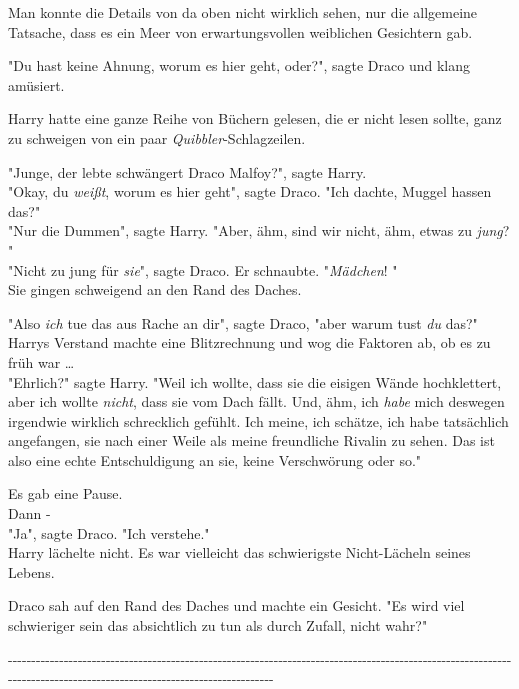 {Man konnte die Details von da oben nicht wirklich sehen, nur die allgemeine Tatsache, dass es ein Meer von erwartungsvollen weiblichen Gesichtern gab.

"Du hast keine Ahnung, worum es hier geht, oder?", sagte Draco und klang amüsiert.

Harry hatte eine ganze Reihe von Büchern gelesen, die er nicht lesen sollte, ganz zu schweigen von ein paar \emph{Quibbler}-Schlagzeilen.

"Junge, der lebte schwängert Draco Malfoy?", sagte Harry.\\ "Okay, du \emph{weißt}, worum es hier geht", sagte Draco. "Ich dachte, Muggel hassen das?"\\ "Nur die Dummen", sagte Harry. "Aber, ähm, sind wir nicht, ähm, etwas zu \emph{jung}? "\\ "Nicht zu jung für \emph{sie}", sagte Draco. Er schnaubte. "\emph{Mädchen}! "\\ Sie gingen schweigend an den Rand des Daches.

"Also \emph{ich} tue das aus Rache an dir", sagte Draco, "aber warum tust \emph{du} das?"\\ Harrys Verstand machte eine Blitzrechnung und wog die Faktoren ab, ob es zu früh war …\\ "Ehrlich?" sagte Harry. "Weil ich wollte, dass sie die eisigen Wände hochklettert, aber ich wollte \emph{nicht}, dass sie vom Dach fällt. Und, ähm, ich \emph{habe} mich deswegen irgendwie wirklich schrecklich gefühlt. Ich meine, ich schätze, ich habe tatsächlich angefangen, sie nach einer Weile als meine freundliche Rivalin zu sehen. Das ist also eine echte Entschuldigung an sie, keine Verschwörung oder so."

Es gab eine Pause.\\ Dann -\\ "Ja", sagte Draco. "Ich verstehe."\\ Harry lächelte nicht. Es war vielleicht das schwierigste Nicht-Lächeln seines Lebens.

Draco sah auf den Rand des Daches und machte ein Gesicht. "Es wird viel schwieriger sein das absichtlich zu tun als durch Zufall, nicht wahr?"

-\/-\/-\/-\/-\/-\/-\/-\/-\/-\/-\/-\/-\/-\/-\/-\/-\/-\/-\/-\/-\/-\/-\/-\/-\/-\/-\/-\/-\/-\/-\/-\/-\/-\/-\/-\/-\/-\/-\/-\/-\/-\/-\/-\/-\/-\/-\/-\/-\/-\/-\/-\/-\/-\/-\/-\/-\/-\/-\/-\/-\/-\/-\/-\/-\/-\/-\/-\/-\/-\/-\/-\/-\/-\/-\/-\/-\/-\/-\/-\/-\/-\/-\/-\/-\/-\/-\/-\/-\/-\/-\/-\/-\/-\/-\/-\/-\/-\/-\/-\/-\/-\/-\/-\/-\/-\/-\/-\/-\/-\/-\/-\/-\/-\/-\/-\/-\/-\/-\/-\/-\/-\/-\/-\/-\/-\/-\/-\/-\/-\/-\/-\/-\/-\/-\/-\/-\/-\/-\/-\/-\/-\/-\/-\/-\/-\/-\/-\/-\/-\/-\/-\/-\/-\/-\/-\/-\/-\/-\/-\/-\/-\/-\/-\/-

}
